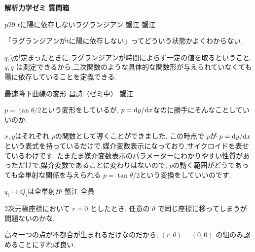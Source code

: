 \documentclass{jlreq}
\newcommand{\qsep}{%
  \tcblower
  \medskip
}
\begin{document}

  

  



\begin{flushleft}
  \Huge \textbf{解析力学ゼミ 質問箱 }
\end{flushleft}
\vspace{1\baselineskip}

\begin{qboxok}
  {p29  \( t \)に陽に依存しないラグランジアン}
  {蟹江}
  {蟹江}
  
  「ラグランジアンが\( t \)に陽に依存しない」ってどういう状態かよくわからない.

  \qsep

  \( q , \dot{q}\)が定まったときに,ラグランジアンが時間によらず一定の値を取るということ.
  \( q, \dot{q} \) は測定できるから,二次関数のような具体的な関数形が与えられていなくても
  陽に依存していることを定義できる.

\end{qboxok}

\begin{qboxok}
  {最速降下曲線の変形}
  {昌詩（ゼミ中）}
  {蟹江}

  \( p=\tan θ/2 \)という変形をしているが,
  \( p= \difs yx \)なのに勝手にそんなことしていいのか. 

  \qsep

  \( x ,y\)はそれぞれ \( p \)の関数として導くことができました.
  この時点で \( p \)が \( p= \difs yx \)という表式を持っているだけで,媒介変数表示になっており,サイクロイドを表せているわけです.
  たまたま媒介変数表示のパラメーターにわかりやすい性質があっただけで,媒介変数であることに変わりはないので,
  \( p \)の動く範囲がどうであっても全単射な関係を与えられる \( p=\tan θ/2 \)という変換をしていいのです.
\end{qboxok}

\begin{qboxok}
  { \( q_i \mapsto Q_i \)は全単射か }
  {蟹江}
  {全員}

  2次元極座標において \( r=0 \) としたとき,
  任意の \( θ \) で同じ座標に移ってしまうが問題ないのかな.
  
  \qsep

  高々一つの点が不都合が生まれるだけなのだから,
  \( (r,θ) = (0,0) \) の組のみ認めることにすれば良い.

\end{qboxok}
\end{document}
